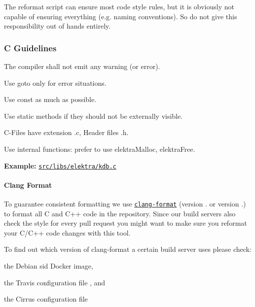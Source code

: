 The reformat script can ensure most code style rules, but it is obviously not capable of ensuring everything (e.\+g. naming conventions). So do not give this responsibility out of hands entirely.

\subsubsection*{C Guidelines}


\begin{DoxyItemize}
\item The compiler shall not emit any warning (or error).
\item Use goto only for error situations.
\item Use {\ttfamily const} as much as possible.
\item Use {\ttfamily static} methods if they should not be externally visible.
\item C-\/\+Files have extension {\ttfamily .c}, Header files {\ttfamily .h}.
\item Use internal functions\+: prefer to use {\ttfamily elektra\+Malloc}, {\ttfamily elektra\+Free}.
\end{DoxyItemize}

{\bfseries Example\+:} \href{/home/markus/Projekte/Elektra/current/src/libs/elektra/kdb.c}{\tt src/libs/elektra/kdb.\+c}

\paragraph*{Clang Format}

To guarantee consistent formatting we use \href{https://clang.llvm.org/docs/ClangFormat.html}{\tt {\ttfamily clang-\/format}} (version {.} or version {.}) to format all C and C++ code in the repository. Since our build servers also check the style for every pull request you might want to make sure you reformat your C/\+C++ code changes with this tool.

To find out which version of {\ttfamily clang-\/format} a certain build server uses please check\+:


\begin{DoxyItemize}
\item the Debian sid Docker image,
\item the Travis configuration file , and
\item the Cirrus configuration file
\end{DoxyItemize}

